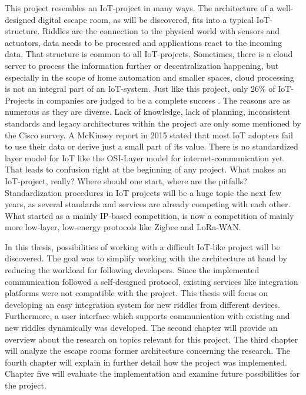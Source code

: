 This project resembles an IoT-project in many ways.
The architecture of a well-designed digital escape room, as will be discovered, fits into a typical IoT-structure.
Riddles are the connection to the physical world with sensors and actuators, data needs to be processed and applications react to the incoming data.
That structure is common to all IoT-projects. 
Sometimes, there is a cloud server to process the information further or decentralization happening, 
but especially in the scope of home automation and smaller spaces, cloud processing is not an integral part of an IoT-system. 
Just like this project, only 26\% of IoT-Projects in companies are judged to be a complete success \parencite{ciscoresearch}. 
The reasons are as numerous as they are diverse. 
Lack of knowledge, lack of planning, inconsistent standards and legacy architectures within the project are only some mentioned by the Cisco survey.
A McKinsey report \parencite{mcKinsey} in 2015 stated that most IoT adopters fail to use their data or derive just a small part of its value.
There is no standardized layer model for IoT like the OSI-Layer model for internet-communication yet. That leads to confusion right at the beginning of any project.
What makes an IoT-project, really? Where should one start, where are the pitfalls? 
Standardization procedures in IoT projects will be a huge topic the next few years, as several standards and services are already competing with each other.
What started as a mainly IP-based competition, is now a competition of mainly more low-layer, low-energy protocols like Zigbee and LoRa-WAN.

In this thesis, possibilities of working with a difficult IoT-like project will be discovered.
The goal was to simplify working with the architecture at hand by reducing the workload for following developers. 
Since the implemented communication followed a self-designed protocol, existing services like integration platforms were not compatible with the project.
This thesis will focus on developing an easy integration system for new riddles from different devices.
Furthermore, a user interface which supports communication with existing and new riddles dynamically was developed.
The second chapter will provide an overview about the research on topics relevant for this project. 
The third chapter will analyze the escape rooms former architecture concerning the research. 
The fourth chapter will explain in further detail how the project was implemented. 
Chapter five will evaluate the implementation and examine future possibilities for the project.










